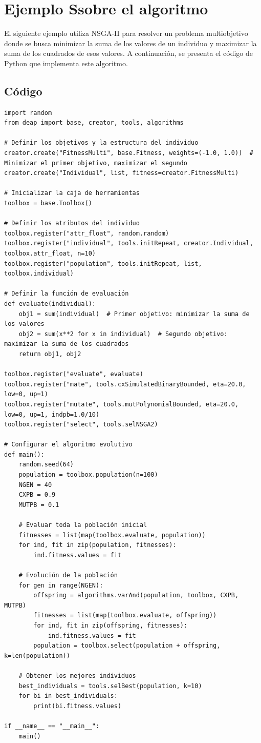 \documentclass[12pt]{article}
\begin{document}
\section*{Ejemplo Ssobre el algoritmo }
El siguiente ejemplo utiliza NSGA-II para resolver un problema multiobjetivo donde se busca minimizar la suma de los valores de un individuo y maximizar la suma de los cuadrados de esos valores. A continuación, se presenta el código de Python que implementa este algoritmo.

\subsection*{Código}
\begin{lstlisting}[style=python]
import random
from deap import base, creator, tools, algorithms

# Definir los objetivos y la estructura del individuo
creator.create("FitnessMulti", base.Fitness, weights=(-1.0, 1.0))  # Minimizar el primer objetivo, maximizar el segundo
creator.create("Individual", list, fitness=creator.FitnessMulti)

# Inicializar la caja de herramientas
toolbox = base.Toolbox()

# Definir los atributos del individuo
toolbox.register("attr_float", random.random)
toolbox.register("individual", tools.initRepeat, creator.Individual, toolbox.attr_float, n=10)
toolbox.register("population", tools.initRepeat, list, toolbox.individual)

# Definir la función de evaluación
def evaluate(individual):
    obj1 = sum(individual)  # Primer objetivo: minimizar la suma de los valores
    obj2 = sum(x**2 for x in individual)  # Segundo objetivo: maximizar la suma de los cuadrados
    return obj1, obj2

toolbox.register("evaluate", evaluate)
toolbox.register("mate", tools.cxSimulatedBinaryBounded, eta=20.0, low=0, up=1)
toolbox.register("mutate", tools.mutPolynomialBounded, eta=20.0, low=0, up=1, indpb=1.0/10)
toolbox.register("select", tools.selNSGA2)

# Configurar el algoritmo evolutivo
def main():
    random.seed(64)
    population = toolbox.population(n=100)
    NGEN = 40
    CXPB = 0.9
    MUTPB = 0.1

    # Evaluar toda la población inicial
    fitnesses = list(map(toolbox.evaluate, population))
    for ind, fit in zip(population, fitnesses):
        ind.fitness.values = fit

    # Evolución de la población
    for gen in range(NGEN):
        offspring = algorithms.varAnd(population, toolbox, CXPB, MUTPB)
        fitnesses = list(map(toolbox.evaluate, offspring))
        for ind, fit in zip(offspring, fitnesses):
            ind.fitness.values = fit
        population = toolbox.select(population + offspring, k=len(population))

    # Obtener los mejores individuos
    best_individuals = tools.selBest(population, k=10)
    for bi in best_individuals:
        print(bi.fitness.values)

if __name__ == "__main__":
    main()
\end{lstlisting}
\end{document}
